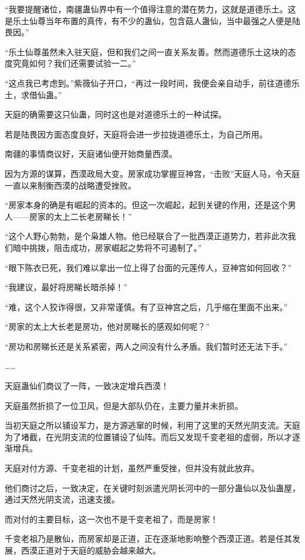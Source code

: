 \begin{this_body}
“我要提醒诸位，南疆蛊仙界中有一个值得注意的潜在势力，这就是道德乐土。这是乐土仙尊当年布置的真传，有不少的蛊仙，包含菇人蛊仙，当中最强之人便是陆畏因。”

“乐土仙尊虽然未入驻天庭，但和我们之间一直关系友善。然而道德乐土这块的态度究竟如何？我们还需要试验一二。”

“这点我已考虑到。”紫薇仙子开口，“再过一段时间，我便会亲自动手，前往道德乐土，求借仙蛊。”

天庭的确需要这只仙蛊，同时这也是对道德乐土的一种试探。

若是陆畏因方面态度良好，天庭将会进一步拉拢道德乐土，为自己所用。

南疆的事情商议好，天庭诸仙便开始商量西漠。

因为方源的谋算，西漠政局大变。房家成功掌握豆神宫，“击败”天庭人马，令天庭一直以来制衡西漠的战略遭受挫败。

“房家本身的确是有崛起的资本的。但这一次崛起，起到关键的作用，还是这个男人——房家的太上二长老房睇长！”

“这个人野心勃勃，是个枭雄人物。他已经联合了一批西漠正道势力，若非此次我们暗中挑拨，阻击成功，房家崛起之势将不可遏制了。”

“眼下陈衣已死，我们难以拿出一位上得了台面的元莲传人，豆神宫如何回收？”

“我建议，最好将房睇长暗杀掉！”

“难，这个人狡诈得很，又非常谨慎。有了豆神宫之后，几乎缩在里面不出来。”

“房家的太上大长老是房功，他对房睇长的感观如何呢？”

“房功和房睇长还是关系紧密，两人之间没有什么矛盾。我们暂时还无法下手。”

……

天庭蛊仙们商议了一阵，一致决定增兵西漠！

天庭虽然折损了一位卫风，但是大部队仍在，主要力量并未折损。

当初天庭之所以铺设军力，是方源逃窜的时候，利用了这里的天然光阴支流。天庭为了堵截，在光阴支流的位置铺设了仙阵。而后又发现千变老祖的虚弱，所以才逐渐增兵。

天庭对付方源、千变老祖的计划，虽然严重受挫，但并没有就此放弃。

他们商讨之后，一致决定，在关键时刻派遣光阴长河中的一部分蛊仙以及仙蛊屋，通过天然光阴支流，迅速支援。

而对付的主要目标，这一次也不是千变老祖了，而是房家！

千变老祖乃是散仙，而房家却是正道，正在逐渐地影响整个西漠正道。若是任其发展，西漠正道对于天庭的威胁会越来越大。


\end{this_body}
